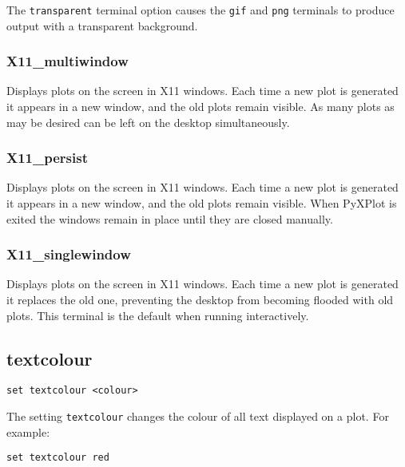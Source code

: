 The {\tt transparent} terminal option causes the {\tt gif} and {\tt png}
terminals to produce output with a transparent background.


\subsubsection{X11\_multiwindow}

Displays plots on the screen in X11 windows. Each time a new
plot is generated it appears in a new window, and the old plots remain visible.
As many plots as may be desired can be left on the desktop simultaneously.

\subsubsection{X11\_persist}

Displays plots on the screen in X11 windows.  Each time a new
plot is generated it appears in a new window, and the old plots remain visible.
When PyXPlot is exited the windows remain in place until they are closed
manually.

\subsubsection{X11\_singlewindow}

Displays plots on the screen in X11 windows. Each time a new
plot is generated it replaces the old one, preventing the desktop from becoming
flooded with old plots. This terminal is the default when running
interactively.


\subsection{textcolour}

\begin{verbatim}
set textcolour <colour>
\end{verbatim}

The setting {\tt textcolour} changes the colour of all text displayed on a plot.
For example:

\begin{verbatim}
set textcolour red
\end{verbatim}

